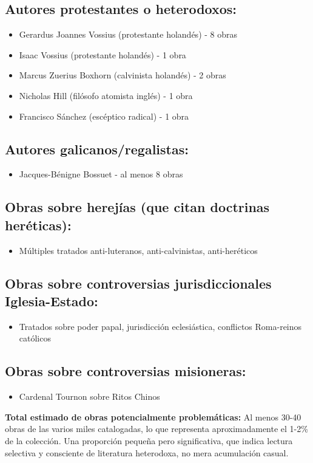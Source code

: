 \documentclass[12pt,a4paper]{article}
\begin{document}
\subsection*{Autores protestantes o heterodoxos:}
\begin{itemize}
    \item Gerardus Joannes Vossius (protestante holandés) - 8 obras
    \item Isaac Vossius (protestante holandés) - 1 obra
    \item Marcus Zuerius Boxhorn (calvinista holandés) - 2 obras
    \item Nicholas Hill (filósofo atomista inglés) - 1 obra
    \item Francisco Sánchez (escéptico radical) - 1 obra
\end{itemize}

\subsection*{Autores galicanos/regalistas:}
\begin{itemize}
    \item Jacques-Bénigne Bossuet - al menos 8 obras
\end{itemize}

\subsection*{Obras sobre herejías (que citan doctrinas heréticas):}
\begin{itemize}
    \item Múltiples tratados anti-luteranos, anti-calvinistas, anti-heréticos
\end{itemize}

\subsection*{Obras sobre controversias jurisdiccionales Iglesia-Estado:}
\begin{itemize}
    \item Tratados sobre poder papal, jurisdicción eclesiástica, conflictos Roma-reinos católicos
\end{itemize}

\subsection*{Obras sobre controversias misioneras:}
\begin{itemize}
    \item Cardenal Tournon sobre Ritos Chinos
\end{itemize}

\textbf{Total estimado de obras potencialmente problemáticas:} Al menos 30-40 obras de las varios miles catalogadas, lo que representa aproximadamente el 1-2\% de la colección. Una proporción pequeña pero significativa, que indica lectura selectiva y consciente de literatura heterodoxa, no mera acumulación casual.
\end{document}

